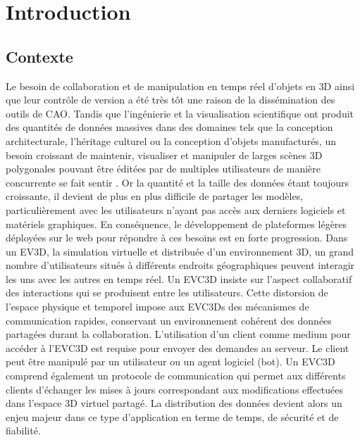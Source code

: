 \chapter{Introduction}
\chaptertable
\section{Contexte}
Le besoin de collaboration et de manipulation en temps réel d'objets en \gls{3D} 
ainsi que leur contrôle de version a été très tôt une raison de la dissémination des 
outils de \gls{CAO}. Tandis que l'ingénierie et la visualisation scientifique ont 
produit des quantités de données massives dans des domaines tels que la 
conception architecturale, l'héritage culturel ou la conception d'objets manufacturés, un 
besoin croissant de maintenir, visualiser et manipuler de larges scènes \gls{3D} 
polygonales pouvant être éditées par de multiples utilisateurs de manière 
concurrente se fait sentir \cite{Chandrasegaran2013,Wu2014}. Or la quantité et la taille des données 
étant toujours croissante, il devient de plus en plus difficile de partager les 
modèles, particulièrement avec les utilisateurs n'ayant pas accès aux derniers 
logiciels et matériels graphiques. En conséquence,
le développement de plateformes légères déployées sur le web pour répondre à ces 
besoins est en forte progression. 
Dans un \gls{EV3D}, la simulation virtuelle et distribuée d'un 
environnement \gls{3D}, un grand nombre d'utilisateurs situés à différents endroits 
géographiques peuvent 
interagir les uns avec les autres en temps réel. Un \gls{EVC3D} insiste sur l'aspect collaboratif des interactions qui se produisent entre les utilisateurs.
Cette distorsion de l'espace physique et temporel impose aux \glspl{EVC3D} des 
mécanismes de communication rapides, conservant un environnement cohérent
des données partagées durant la collaboration. 
L'utilisation d'un client comme medium pour 
accéder à l'\gls{EVC3D} est requise pour envoyer des demandes au serveur. Le 
client peut être manipulé par un utilisateur ou un agent logiciel (bot).
Un \gls{EVC3D} comprend également un protocole de communication qui 
permet aux différents clients d'échanger les mises à jours correspondant aux 
modifications effectuées dans l'espace \gls{3D} virtuel partagé. La distribution des 
données devient alors un enjeu majeur dans ce type d'application en terme de 
temps, de sécurité et de fiabilité. 



